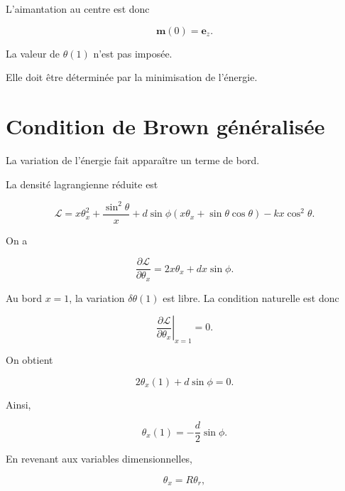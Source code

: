 \documentclass[a4paper,11pt]{article}
\newcommand{\m}{\bm{m}}
\newcommand{\ez}{\bm{e}_z}
\begin{document}
L'aimantation au centre est donc

\begin{equation}
\m(0)=\ez.
\end{equation}

La valeur de $\theta(1)$ n'est pas imposée.

Elle doit être déterminée par la minimisation de l'énergie.

\section{Condition de Brown généralisée}

La variation de l'énergie fait apparaître un terme de bord.

La densité lagrangienne réduite est

\begin{equation}
\mathcal{L}
=
x\theta_x^2
+
\frac{\sin^2\theta}{x}
+
d\sin\phi
\left(
x\theta_x
+
\sin\theta\cos\theta
\right)
-
kx\cos^2\theta.
\end{equation}

On a

\begin{equation}
\frac{\partial\mathcal L}
{\partial\theta_x}
=
2x\theta_x
+
dx\sin\phi.
\end{equation}

Au bord $x=1$, la variation $\delta\theta(1)$ est libre. La condition
naturelle est donc

\begin{equation}
\left.
\frac{\partial\mathcal L}
{\partial\theta_x}
\right|_{x=1}
=0.
\end{equation}

On obtient

\begin{equation}
2\theta_x(1)
+
d\sin\phi
=0.
\end{equation}

Ainsi,

\begin{equation}
\boxed{
\theta_x(1)
=
-\frac{d}{2}\sin\phi.
}
\end{equation}

En revenant aux variables dimensionnelles,

\begin{equation}
\theta_x
=
R\theta_r,
\end{equation}
\end{document}

